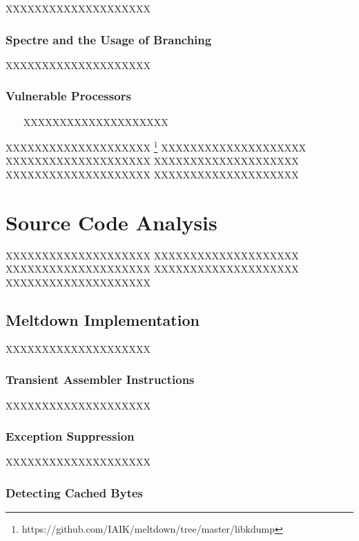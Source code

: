 \documentclass[a4paper,oneside,openright] {scrreprt}
\begin{document}
XXXXXXXXXXXXXXXXXXXX

\subsection{Spectre and the Usage of Branching}
\label{ch:intro:motivation:A}

XXXXXXXXXXXXXXXXXXXX

\subsection{Vulnerable Processors}
\label{ch:intro:motivation:A}

~\cite{kocher2018spectre}~\cite{lipp2018meltdown}~\cite{hennessy2011computer}
XXXXXXXXXXXXXXXXXXXX

XXXXXXXXXXXXXXXXXXXX
\footnote{https://github.com/IAIK/meltdown/tree/master/libkdump}
XXXXXXXXXXXXXXXXXXXX
XXXXXXXXXXXXXXXXXXXX
XXXXXXXXXXXXXXXXXXXX
XXXXXXXXXXXXXXXXXXXX
XXXXXXXXXXXXXXXXXXXX

\chapter{Source Code Analysis}
\label{ch:sourceCodeAnalysis}

XXXXXXXXXXXXXXXXXXXX
XXXXXXXXXXXXXXXXXXXX
XXXXXXXXXXXXXXXXXXXX
XXXXXXXXXXXXXXXXXXXX
XXXXXXXXXXXXXXXXXXXX

\section{Meltdown Implementation}
\label{ch:intro:motivation}

XXXXXXXXXXXXXXXXXXXX


\subsection{Transient Assembler Instructions}
\label{ch:intro:motivation:A}

XXXXXXXXXXXXXXXXXXXX

\subsection{Exception Suppression}
\label{ch:intro:motivation:A}

XXXXXXXXXXXXXXXXXXXX

\subsection{Detecting Cached Bytes}
\label{ch:intro:motivation:A}
\end{document}
